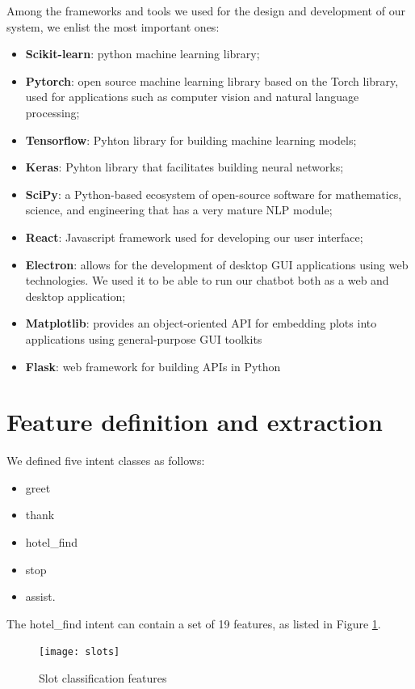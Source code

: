 \documentclass[runningheads,a4paper,11pt]{report}
\begin{document}
Among the frameworks and tools we used for the design and development of our system, we enlist the most important ones:
\begin{itemize}
	\item \textbf{Scikit-learn}: python machine learning library;
	\item \textbf{Pytorch}: open source machine learning library based on the Torch library, used for applications such as computer vision and natural language processing;
	\item \textbf{Tensorflow}: Pyhton library for building machine learning models;
	\item \textbf{Keras}:  Pyhton library that facilitates building neural networks;
	\item \textbf{SciPy}: a Python-based ecosystem of open-source software for mathematics, science, and engineering that has a very mature NLP module;
	\item \textbf{React}: Javascript framework used for developing our user interface;
	\item \textbf{Electron}: allows for the development of desktop GUI applications using web technologies. We used it to be able to run our chatbot both as a web and desktop application;
	\item \textbf{Matplotlib}: provides an object-oriented API for embedding plots into applications using general-purpose GUI toolkits
	\item \textbf{Flask}: web framework for building APIs in Python
\end{itemize}

\section{Feature definition and extraction}
\label{section:features}

We defined five intent classes as follows: 
\begin{itemize}
	\item greet
	\item thank
	\item hotel\_find
	\item stop
	\item assist.
\end{itemize}

The hotel\_find intent can contain a set of 19 features, as listed in Figure \ref{slots}.

\begin{figure}
\centerline{\texttt{[image: slots]}}  
	\caption{Slot classification features}
	\label{slots}
\end{figure}
\end{document}
